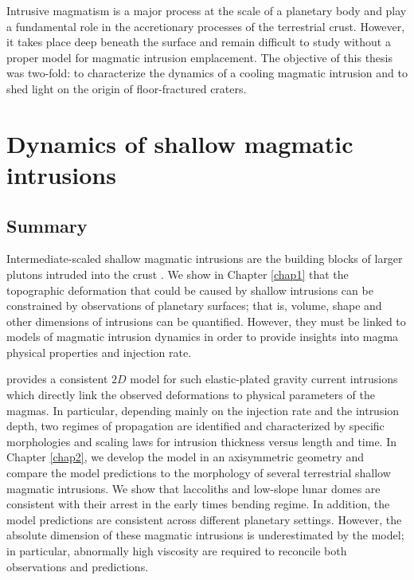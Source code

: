 Intrusive magmatism  is a major  process at  the scale of  a planetary
body and play a fundamental role  in the accretionary processes of the
terrestrial crust. However,  it takes  place deep beneath  the surface  and remain
difficult  to study  without  a proper  model  for magmatic  intrusion
emplacement.  The objective of this thesis was two-fold: to characterize the
dynamics of  a cooling  magmatic intrusion  and to  shed light  on the
origin of floor-fractured craters. 

\section*{Dynamics of shallow magmatic intrusions}

\subsection*{Summary}
\label{sec:summary}

Intermediate-scaled  shallow  magmatic  intrusions  are  the  building
blocks    of    larger    plutons     intruded    into    the    crust
\citep{Petford:2000cc,Glazner:2004gv}.  We show in Chapter \ref{chap1}
that  the topographic  deformation  that could  be  caused by  shallow
intrusions can  be constrained by observations  of planetary surfaces;
that  is, volume,  shape and  other  dimensions of  intrusions can  be
quantified.   However,  they must  be  linked  to models  of  magmatic
intrusion dynamics  in order to  provide insights into  magma physical
properties and injection rate.

\citet{Michaut:2011kg}  provides  a  consistent $2D$  model  for  such
elastic-plated  gravity current  intrusions  which  directly link  the
observed  deformations  to  physical  parameters of  the  magmas.   In
particular, depending mainly  on the injection rate  and the intrusion
depth, two regimes of propagation  are identified and characterized by
specific morphologies and scaling  laws for intrusion thickness versus
length and time.   In Chapter \ref{chap2}, we develop the  model in an
axisymmetric  geometry  and  compare  the  model  predictions  to  the
morphology  of several  terrestrial shallow  magmatic intrusions.   We
show that  laccoliths and  low-slope lunar  domes are  consistent with
their arrest in the early times bending regime. In addition, the model
predictions    are     consistent    across     different    planetary
settings. However, the absolute dimension of these magmatic intrusions
is  underestimated  by  the  model;  in  particular,  abnormally  high
viscosity are required to reconcile both observations and predictions.

